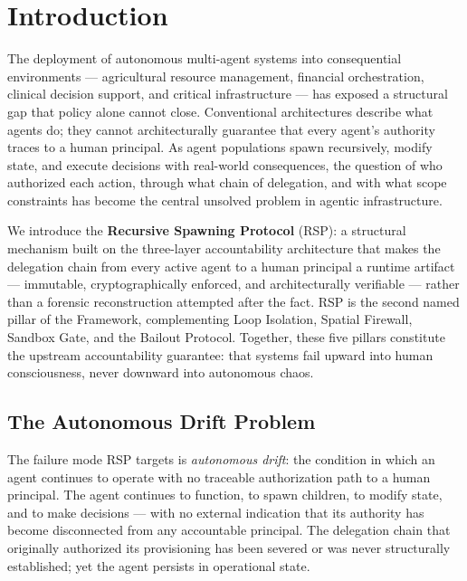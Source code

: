 \section{Introduction}
\label{sec:rs-intro}

The deployment of autonomous multi-agent systems into consequential environments — agricultural resource management, financial orchestration, clinical decision support, and critical infrastructure — has exposed a structural gap that policy alone cannot close. Conventional architectures describe what agents do; they cannot architecturally guarantee that every agent's authority traces to a human principal. As agent populations spawn recursively, modify state, and execute decisions with real-world consequences, the question of who authorized each action, through what chain of delegation, and with what scope constraints has become the central unsolved problem in agentic infrastructure.

We introduce the \textbf{Recursive Spawning Protocol} (RSP): a structural mechanism built on the \bxthree{} three-layer accountability architecture that makes the delegation chain from every active agent to a human principal a runtime artifact — immutable, cryptographically enforced, and architecturally verifiable — rather than a forensic reconstruction attempted after the fact. RSP is the second named pillar of the \bxthree{} Framework, complementing Loop Isolation, Spatial Firewall, Sandbox Gate, and the Bailout Protocol. Together, these five pillars constitute the upstream accountability guarantee: that \bxthree{} systems fail upward into human consciousness, never downward into autonomous chaos.

\subsection{The Autonomous Drift Problem}

The failure mode RSP targets is \emph{autonomous drift}: the condition in which an agent continues to operate with no traceable authorization path to a human principal. The agent continues to function, to spawn children, to modify state, and to make decisions — with no external indication that its authority has become disconnected from any accountable principal. The delegation chain that originally authorized its provisioning has been severed or was never structurally established; yet the agent persists in operational state.

